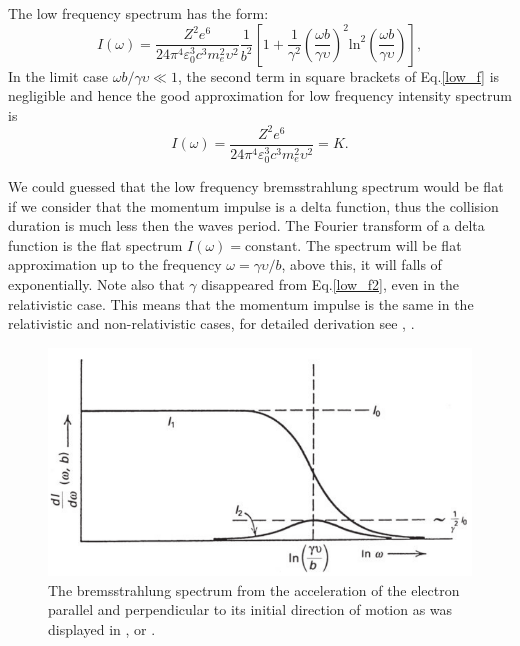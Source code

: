 \documentclass[oneside,a4paper,11pt]{report}
\begin{document}
The low frequency spectrum has the form: 
\begin{equation}
 \label{low_f}
I(\omega) = \frac{Z^2 e^6}{24 \pi^4 \varepsilon_0^3 c^3 m_e^2 \upsilon^2 } \frac{1}{b^2} \left [ 1 + \frac{1}{\gamma^2} \left ( \frac{\omega b}{\gamma \upsilon} \right )^2 \mathrm{ln}^2 \left ( \frac{\omega b}{\gamma \upsilon} \right ) \right ],
\end{equation}
In the limit case $\omega b / \gamma \upsilon \ll 1$, the second term in square brackets of Eq.\eqref{low_f} 
is negligible and hence the good approximation for low frequency intensity spectrum is 
\begin{equation}
 \label{low_f2}
I(\omega) = \frac{Z^2 e^6}{24 \pi^4 \varepsilon_0^3 c^3 m_e^2 \upsilon^2 } = K.
\end{equation}

We could guessed that the low frequency bremsstrahlung spectrum would be flat if we consider that the 
momentum impulse is a delta function, thus the collision duration is much less then the waves period. 
The Fourier transform of a delta function is the flat spectrum $I(\omega) = \mathrm{constant}$. 
The spectrum will be flat approximation up to the frequency $\omega = \gamma \upsilon /b$, above this, 
it will falls of exponentially. 
Note also that $\gamma$ disappeared from Eq.\eqref{low_f2}, even in the relativistic case. 
This means that the momentum impulse is the same in the relativistic and non-relativistic cases, 
for detailed derivation see \citet{longair:1}, \citet{jackson}. 

\begin{figure}[hbt]
\centering
\includegraphics[totalheight=5cm]{plot/brem_jackson}
\caption{The bremsstrahlung spectrum from the acceleration of the electron parallel and perpendicular
to its initial direction of motion as was displayed in \citet{jackson}, or \citet{rybicki:1}.}
\label{jackson_brem} 
\end{figure}
\end{document}
